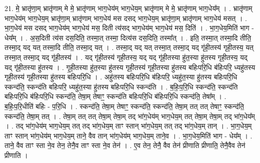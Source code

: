 \documentclass[17pt]{extarticle}
\begin{document}
21. मे॒ भ्रातृ॑णा॒म् भ्रातृ॑णाम् मे मे॒ भ्रातृ॑णाम् भाग॒धेय॑म् भाग॒धेय॒म् भ्रातृ॑णाम् मे मे॒ भ्रातृ॑णाम् भाग॒धेय᳚म् । . भ्रातृ॑णाम् भाग॒धेय॑म् भाग॒धेय॒म् भ्रातृ॑णा॒म् भ्रातृ॑णाम् भाग॒धेय॑ मस दसद् भाग॒धेय॒म् भ्रातृ॑णा॒म् भ्रातृ॑णाम् भाग॒धेय॑ मसत् । . भा॒ग॒धेय॑ मस दसद् भाग॒धेय॑म् भाग॒धेय॑ मस॒ दिती त्य॑सद् भाग॒धेय॑म् भाग॒धेय॑ मस॒ दिति॑ । . भा॒ग॒धेय॒मिति॑ भाग - धेय᳚म् । . अ॒स॒दिती त्य॑स दस॒दिति॒ तस्मा॒त् तस्मा॒ दित्य॑स दस॒दिति॒ तस्मा᳚त् । . इति॒ तस्मा॒त् तस्मा॒दि तीति॒ तस्मा॒द् यद् यत् तस्मा॒दि तीति॒ तस्मा॒द् यत् । . तस्मा॒द् यद् यत् तस्मा॒त् तस्मा॒द् यद् गृ॑ही॒तस्य॑ गृही॒तस्य॒ यत् तस्मा॒त् तस्मा॒द् यद् गृ॑ही॒तस्य॑ । . यद् गृ॑ही॒तस्य॑ गृही॒तस्य॒ यद् यद् गृ॑ही॒तस्या हु॑त॒स्या हु॑तस्य गृही॒तस्य॒ यद् यद् गृ॑ही॒तस्या हु॑तस्य । . गृ॒ही॒तस्या हु॑त॒स्या हु॑तस्य गृही॒तस्य॑ गृही॒तस्या हु॑तस्य बहिःपरि॒धि ब॑हिःपरि॒ ध्यहु॑तस्य गृही॒तस्य॑ गृही॒तस्या हु॑तस्य बहिःपरि॒धि । . अहु॑तस्य बहिःपरि॒धि ब॑हिःपरि॒ ध्यहु॑त॒स्या हु॑तस्य बहिःपरि॒धि स्कन्द॑ति॒ स्कन्द॑ति बहिःपरि॒ 
ध्यहु॑त॒स्या हु॑तस्य बहिःपरि॒धि स्कन्द॑ति । . ब॒हिः॒प॒रि॒धि स्कन्द॑ति॒ स्कन्द॑ति बहिःपरि॒धि ब॑हिःपरि॒धि स्कन्द॑ति॒ तेषा॒म् तेषाꣳ॒॒ स्कन्द॑ति बहिःपरि॒धि ब॑हिःपरि॒धि स्कन्द॑ति॒ तेषा᳚म् । . ब॒हिः॒प॒रि॒धीति॑ बहिः - प॒रि॒धि । . स्कन्द॑ति॒ तेषा॒म् तेषाꣳ॒॒ स्कन्द॑ति॒ स्कन्द॑ति॒ तेषा॒म् तत् तत् तेषाꣳ॒॒ स्कन्द॑ति॒ स्कन्द॑ति॒ तेषा॒म् तत् । . तेषा॒म् तत् तत् तेषा॒म् तेषा॒म् तद् भा॑ग॒धेय॑म् भाग॒धेय॒म् तत् तेषा॒म् तेषा॒म् तद् भा॑ग॒धेय᳚म् । . तद् भा॑ग॒धेय॑म् भाग॒धेय॒म् तत् तद् भा॑ग॒धेय॒म् ताꣳ स्तान् भा॑ग॒धेय॒म् तत् तद् भा॑ग॒धेय॒म् तान् । . भा॒ग॒धेय॒म् ताꣳ स्तान् भा॑ग॒धेय॑म् भाग॒धेय॒म् ताने॒ वैव तान् भा॑ग॒धेय॑म् भाग॒धेय॒म् ताने॒व । . भा॒ग॒धेय॒मिति॑ भाग - धेय᳚म् । . ताने॒ वैव ताꣳ स्ता ने॒व तेन॒ तेनै॒व ताꣳ स्ता ने॒व तेन॑ । . ए॒व तेन॒ तेनै॒ वैव तेन॑ प्रीणाति प्रीणाति॒ तेनै॒वैव तेन॑ प्रीणाति । \newline
\end{document}

